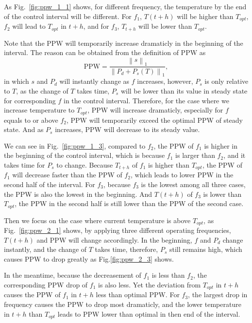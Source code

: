 As Fig.~\ref{fig:ppw_1_1} shows, for different frequency, the temperature by the end of the control interval will be different. For $f_{1}$, $T(t+h)$ will be higher than $T_{opt}$, $f_{2}$ will lead to $T_{opt}$ in $t+h$, and for $f_{3}$, $T_{t+h}$ will be lower than $T_{opt}$.

Note that the PPW will temporarily increase dramaticly in the beginning of the interval. The reason can be obtained from the definition of PPW as
\begin{equation}\label{eq:ppw_detail}
\text{PPW} = \frac{\left \| s \right \|_{1}}{\left \| P_{d}+P_{s}(T) \right \|_{1}},
\end{equation}
in which $s$ and $P_{d}$ will instantly change as $f$ increases, however, $P_{s}$ is only relative to $T$, as the change of $T$ takes time, $P_{s}$ will be lower than its value in steady state for corresponding $f$ in the control interval. Therefore, for the case where we increase temperature to $T_{opt}$, PPW will increase dramaticly, especially for $f$ equals to or above $f_{2}$, PPW will temporarily exceed the optimal PPW of steady state. And as $P_{s}$ increases, PPW will decrease to its steady value.

We can see in Fig.~\ref{fig:ppw_1_3}, compared to $f_{2}$, the PPW of $f_{1}$ is higher in the beginning of the control interval, which is because $f_{1}$ is larger than $f_{2}$, and it takes time for $P_{s}$ to change. Because $T_{t+h}$ of $f_{1}$ is higher than $T_{opt}$, the PPW of $f_{1}$ will decrease faster than the PPW of $f_{2}$, which leads to lower PPW in the second half of the interval. For $f_{3}$, because $f_{3}$ is the lowest among all three cases, the PPW is also the lowest in the beginning. And $T(t+h)$ of $f_{3}$ is lower than $T_{opt}$, the PPW in the second half is still lower than the PPW of the second case. 

Then we focus on the case where current temperature is above $T_{opt}$, as Fig.~\ref{fig:ppw_2_1} shows, by applying three different operating frequencies, $T(t+h)$ and PPW will change accordingly. In the beginning, $f$ and $P_{d}$ change instantly, and the change of $T$ takes time, therefore, $P_{s}$ still remains high, which causes PPW to drop greatly as Fig.\ref{fig:ppw_2_3} shows. 

In the meantime, because the decreasement of $f_{1}$ is less than $f_{2}$, the corresponding PPW drop of $f_{1}$ is also less. Yet the deviation from $T_{opt}$ in $t+h$ causes the PPW of $f_{1}$ in $t+h$ less than optimal PPW. For $f_{3}$, the largest drop in frequency causes the PPW to drop most dramaticly, and the lower temperature in $t+h$ than $T_{opt}$ leads to PPW lower than optimal in then end of the interval.  

